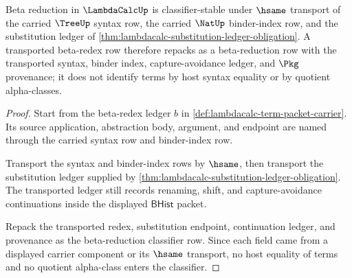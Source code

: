 \begin{theorem}
\label{thm:lambdacalc-beta-reduction-classifier-obligation}
Beta reduction in $\LambdaCalcUp$ is classifier-stable under $\hsame$
transport of the carried $\TreeUp$ syntax row, the carried $\NatUp$
binder-index row, and the substitution ledger of
\autoref{thm:lambdacalc-substitution-ledger-obligation}. A transported
beta-redex row therefore repacks as a beta-reduction row with the transported
syntax, binder index, capture-avoidance ledger, and $\Pkg$ provenance; it does
not identify terms by host syntax equality or by quotient alpha-classes.
\end{theorem}
\begin{proof}
Start from the beta-redex ledger $b$ in
\autoref{def:lambdacalc-term-packet-carrier}. Its source application,
abstraction body, argument, and endpoint are named through the carried syntax
row and binder-index row.

Transport the syntax and binder-index rows by $\hsame$, then transport the
substitution ledger supplied by
\autoref{thm:lambdacalc-substitution-ledger-obligation}. The transported
ledger still records renaming, shift, and capture-avoidance continuations
inside the displayed $\mathsf{BHist}$ packet.

Repack the transported redex, substitution endpoint, continuation ledger, and
provenance as the beta-reduction classifier row. Since each field came from a
displayed carrier component or its $\hsame$ transport, no host equality of
terms and no quotient alpha-class enters the classifier.
\end{proof}

